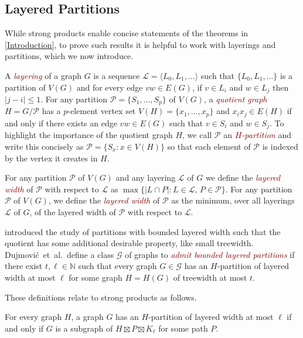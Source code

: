 \documentclass{patmorin}
\newcommand{\defin}[1]{\textcolor{Maroon}{\emph{#1}}}
\renewcommand{\leq}{\leqslant}
\begin{document}
\subsection{Layered Partitions}
\label{LayeredPartitions}

While strong products enable concise statements of the theorems in \cref{Introduction}, to prove such results it is helpful to work with layerings and partitions, which we now introduce.

A \defin{layering} of a graph $G$ is a sequence $\mathcal{L}=\langle L_0,L_1,\ldots\rangle$ such that $\{L_0,L_1,\ldots\}$ is a partition of $V(G)$ and for every edge $vw\in E(G)$, if $v\in L_i$ and $w\in L_j$ then $|j-i|\leq 1$.  For any partition $\mathcal{P}=\{S_1,\ldots,S_p\}$ of $V(G)$, a \defin{quotient graph} $H=G/\mathcal{P}$ has a $p$-element vertex set $V(H)=\{x_1,\ldots,x_p\}$ and $x_ix_j\in E(H)$ if and only if there exists an edge $vw\in E(G)$ such that $v\in S_i$ and $w\in S_j$. To highlight the importance of the quotient graph $H$, we call $\mathcal{P}$ an \defin{$H$-partition} and write this concisely as $\mathcal{P}=\{S_x : x\in V(H)\}$ so that each element of $\mathcal{P}$ is indexed by the vertex it creates in $H$.

For any partition $\mathcal{P}$ of $V(G)$ and any layering $\mathcal{L}$ of $G$ we define the \defin{layered width} of $\mathcal{P}$ with respect to $\mathcal{L}$ as $\max\{|L\cap P|: L\in\mathcal{L},\, P\in\mathcal{P}\}$.  For any partition $\mathcal{P}$ of $V(G)$, we define the \defin{layered width} of $\mathcal{P}$ as the minimum, over all layerings $\mathcal{L}$ of $G$, of the layered width of $\mathcal{P}$ with respect to $\mathcal{L}$.

\citet{DJMMUW20} introduced the study of partitions with bounded layered width such that the quotient has some additional desirable property, like small treewidth. Dujmovi\'c~et~al.\ define a class $\mathcal{G}$ of graphs to \defin{admit bounded layered partitions} if there exist $t,\ell\in\mathbb{N}$ such that every graph $G\in \mathcal{G}$ has an $H$-partition of layered width at most $\ell$ for some graph $H=H(G)$ of treewidth at most $t$.

These definitions relate to strong products as follows.

\begin{lem}
\label{PartitionProduct}
For every graph $H$, a graph $G$ has an $H$-partition of layered width at most $\ell$ if and only if $G$ is a subgraph of $H \boxtimes P \boxtimes K_\ell$ for some path $P$.
\end{lem}
\end{document}
